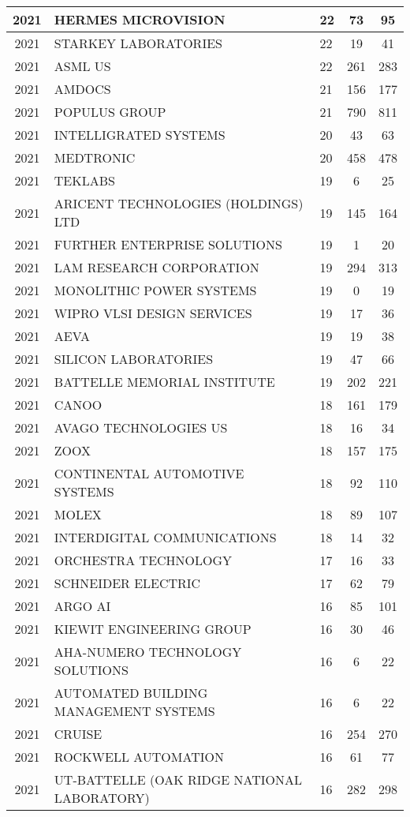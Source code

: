 \documentclass{article}%
\begin{document}
\begin{longtable}{c|p{20em}|p{5em}|c|c}
\hline%
2021&HERMES MICROVISION&22&73&95\\%
\hline%
2021&STARKEY LABORATORIES&22&19&41\\%
\hline%
2021&ASML US&22&261&283\\%
\hline%
2021&AMDOCS&21&156&177\\%
\hline%
2021&POPULUS GROUP&21&790&811\\%
\hline%
2021&INTELLIGRATED SYSTEMS&20&43&63\\%
\hline%
2021&MEDTRONIC&20&458&478\\%
\hline%
2021&TEKLABS&19&6&25\\%
\hline%
2021&ARICENT TECHNOLOGIES (HOLDINGS) LTD&19&145&164\\%
\hline%
2021&FURTHER ENTERPRISE SOLUTIONS&19&1&20\\%
\hline%
2021&LAM RESEARCH CORPORATION&19&294&313\\%
\hline%
2021&MONOLITHIC POWER SYSTEMS&19&0&19\\%
\hline%
2021&WIPRO VLSI DESIGN SERVICES&19&17&36\\%
\hline%
2021&AEVA&19&19&38\\%
\hline%
2021&SILICON LABORATORIES&19&47&66\\%
\hline%
2021&BATTELLE MEMORIAL INSTITUTE&19&202&221\\%
\hline%
2021&CANOO&18&161&179\\%
\hline%
2021&AVAGO TECHNOLOGIES US&18&16&34\\%
\hline%
2021&ZOOX&18&157&175\\%
\hline%
2021&CONTINENTAL AUTOMOTIVE SYSTEMS&18&92&110\\%
\hline%
2021&MOLEX&18&89&107\\%
\hline%
2021&INTERDIGITAL COMMUNICATIONS&18&14&32\\%
\hline%
2021&ORCHESTRA TECHNOLOGY&17&16&33\\%
\hline%
2021&SCHNEIDER ELECTRIC&17&62&79\\%
\hline%
2021&ARGO AI&16&85&101\\%
\hline%
2021&KIEWIT ENGINEERING GROUP&16&30&46\\%
\hline%
2021&AHA{-}NUMERO TECHNOLOGY SOLUTIONS&16&6&22\\%
\hline%
2021&AUTOMATED BUILDING MANAGEMENT SYSTEMS&16&6&22\\%
\hline%
2021&CRUISE&16&254&270\\%
\hline%
2021&ROCKWELL AUTOMATION&16&61&77\\%
\hline%
2021&UT{-}BATTELLE  (OAK RIDGE NATIONAL LABORATORY)&16&282&298\\%

\end{longtable}
\end{document}
